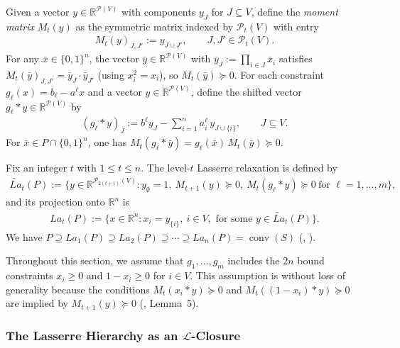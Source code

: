 \documentclass{article}
\newcommand{\R}{\mathbb{R}}
\renewcommand{\P}{\mathcal{P}}
\renewcommand{\L}{\mathcal{L}}
\begin{document}
Given a vector $y \in \R^{\P(V)}$ with components $y_J$ for $J \subseteq V$, define the \emph{moment matrix} $M_t(y)$ as the symmetric matrix indexed by $\P_t(V)$ with entry
\begin{align}
    M_t(y)_{J, J'} := y_{J \cup J'}, \qquad J, J' \in \P_t(V). \label{def:moment-matrix}
\end{align}
For any $\bar x \in \{0,1\}^n$, the vector $\bar y \in \R^{\P(V)}$ with $\bar y_J := \prod_{i \in J} \bar x_i$ satisfies $M_t(\bar y)_{J,J'} = \bar y_J \cdot \bar y_{J'}$ (using $x_i^2 = x_i$), so $M_t(\bar y) \succeq 0$. For each constraint $g_\ell(x) = b_\ell - {a^\ell} x$ and a vector $y \in \R^{\P(V)}$, define the shifted vector $g_\ell * y \in \R^{\P(V)}$ by
\begin{align}
    (g_\ell * y)_J := b^\ell y_J - \sum_{i=1}^n a^\ell_i \, y_{J \cup \{i\}}, \qquad J \subseteq V. \label{def:localizing-product}
\end{align}
For $\bar x \in P \cap \{0,1\}^n$, one has $M_t(g_\ell * \bar y) = g_\ell(\bar x)\, M_t(\bar y) \succeq 0$.

Fix an integer $t$ with $1 \leq t \leq n$. The level-$t$ Lasserre relaxation is defined by
\begin{align}
    \widetilde{La}_t(P) := \{y \in \R^{\P_{2(t+1)}(V)} : y_\emptyset = 1, \ M_{t+1}(y) \succeq 0, \ M_t(g_\ell * y) \succeq 0 \ \text{for } \ell = 1,\ldots,m\}, \label{def:lasserre-lifted}
\end{align}
and its projection onto $\R^n$ is
\begin{align}
    La_t(P) := \{x \in \R^n : x_i = y_{\{i\}}, \ i \in V, \text{ for some } y \in \widetilde{La}_t(P)\}. \label{def:lasserre-projected}
\end{align}
We have $P \supseteq La_1(P) \supseteq La_2(P) \supseteq \cdots \supseteq La_n(P) = \operatorname{conv}(S)$ (\cite{lasserre2001explicit}, \cite{laurent2003comparison}).

Throughout this section, we assume that $g_1,\ldots,g_m$ includes the $2n$ bound constraints $x_i \geq 0$ and $1 - x_i \geq 0$ for $i \in V$. This assumption is without loss of generality because the conditions $M_t(x_i * y) \succeq 0$ and $M_t((1-x_i) * y) \succeq 0$ are implied by $M_{t+1}(y) \succeq 0$ (\cite{laurent2003comparison}, Lemma~5).

\subsubsection{The Lasserre Hierarchy as an \texorpdfstring{$\L$}{L}-Closure} \label{subsec:lasserre-as-L}
\end{document}
